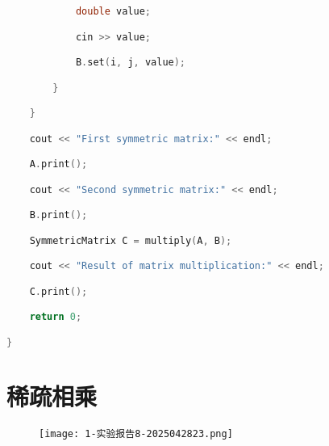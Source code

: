 \begin{lstlisting}[language=C++]
            double value;

            cin >> value;

            B.set(i, j, value);

        }

    }

    cout << "First symmetric matrix:" << endl;

    A.print();

    cout << "Second symmetric matrix:" << endl;

    B.print();

    SymmetricMatrix C = multiply(A, B);

    cout << "Result of matrix multiplication:" << endl;

    C.print();

    return 0;

}
\end{lstlisting}
\section{稀疏相乘}

\begin{figure}[H]
\centering
\texttt{[image: 1-实验报告8-2025042823.png]}
\label{}
\end{figure}


